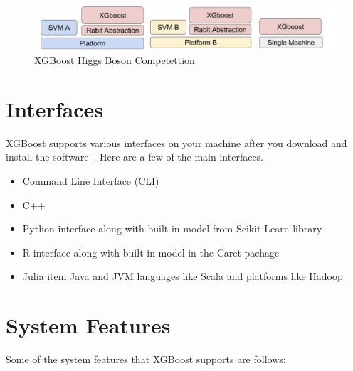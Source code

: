 \begin{figure}[!ht]
  \centering\includegraphics[width=\columnwidth]{images/XGBoost-on-different-platforms.png}
  \caption{XGBoost Higgs Boson Competettion~\cite{hid-sp18-401-XGBoost-on-different-platforms-image}}
\label{f:XGBoost-on-different-platforms}
\end{figure}

\section{Interfaces}

XGBoost supports various interfaces on your machine after you download and
install the software~\cite{hid-sp18-401-XGBoost-MLmastery}. Here are a few 
of the main interfaces.

\begin{itemize}
\item Command Line Interface (CLI)  
\item C++  
\item Python interface along with built in model from Scikit-Learn library   
\item R interface along with built in model in the Caret pachage  
\item Julia item Java and JVM languages like Scala and platforms like Hadoop
\end{itemize}



\section{System Features} 

Some of the system features that XGBoost supports are follows: 

